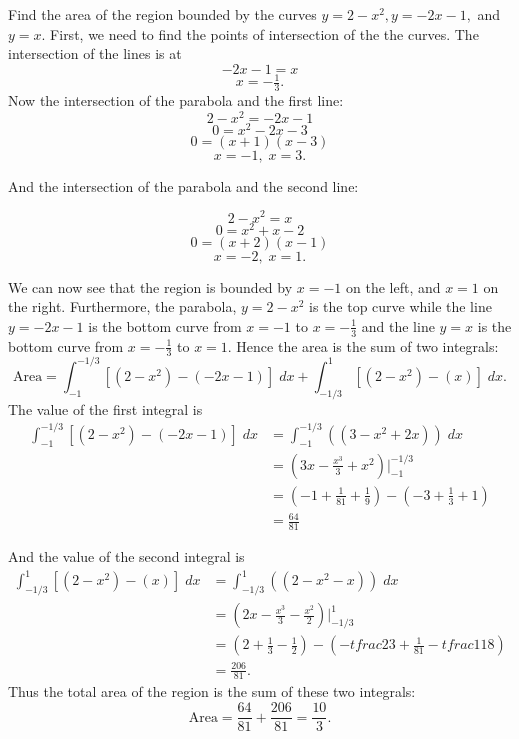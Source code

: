 \documentclass{ximera}
\begin{document}
\begin{example}
Find the area of the region bounded by the curves $y = 2-x^2, y = -2x-1,$ and $y = x$.
First, we need to find the points of intersection of the the curves. The intersection of the lines is at
\[
-2x-1 = x 
\]
\[
x = -\tfrac13.
\]
Now the intersection of the parabola and the first line:
\[
 2-x^2 = -2x-1
\]
\[
   0 = x^2 -2x -3 
\]
\[
   0 = (x+1)(x-3)
\]
\[
    x = -1, \; x = 3.
\]

And the intersection of the parabola and the second line:

\[
 2-x^2 = x
\]
\[
   0 =x^2 +x -2
\]
\[
   0 =(x+2)(x-1)
\]
\[
   x = -2, \; x = 1.
\]

We can now see that the region is bounded by $x = -1$ on the left, and  $x = 1$ on the right.
Furthermore, the parabola, $y = 2 - x^2$ is the top curve while the line $y = -2x-1$ is the bottom curve 
from $x = -1$ to $x = -\frac13$ and the line $y = x$ is the bottom curve from $x = -\frac13$ to $x = 1$.
Hence the area is the sum of two integrals:
\[
\text{Area} = \int_{-1}^{-1/3} \left[(2 - x^2) - (-2x-1)\right] \; dx + \int_{-1/3}^1 \left[(2 - x^2) - (x)\right] \; dx.
\]
The value of the first integral is
\begin{align*}
\int_{-1}^{-1/3} \left[(2 - x^2) - (-2x-1)\right] \; dx &= \int_{-1}^{-1/3} \left((3 - x^2 +2x)\right) \; dx \\
                                                        &= \left(3x - \frac{x^3}{3} + x^2 \right)\bigg|_{-1}^{-1/3} \\
                                                        &= \left(-1 + \tfrac{1}{81} + \tfrac19 \right) - \left(-3 + \tfrac13 + 1 \right) \\
                                                        &= \tfrac{64}{81}
\end{align*}

And the value of the second integral is
\begin{align*}
\int_{-1/3}^{1} \left[(2 - x^2) - (x)\right] \; dx &= \int_{-1/3}^{1} \left((2 - x^2 - x)\right) \; dx \\
                                                        &= \left(2x - \frac{x^3}{3} -\frac{x^2}{2} \right)\bigg|_{-1/3}^{1} \\
                                                        &= \left(2 + \tfrac{1}{3} - \tfrac12 \right) - \left(-tfrac23 + \tfrac{1}{81} -tfrac{1}{18} \right) \\
                                                        &= \tfrac{206}{81}.
\end{align*}
Thus the total area of the region is the sum of these two integrals:
\[
\text{Area} = \frac{64}{81} + \frac{206}{81} = \frac{10}{3}.
\]


\end{example}
\end{document}
